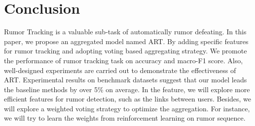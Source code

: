 \section{Conclusion}
\label{sec:conclusion}
Rumor Tracking is a valuable sub-task of automatically rumor defeating. In this paper, we propose an aggregated model named ART.  By adding specific features for rumor tracking and adopting voting based aggregating strategy. We promote the performance of rumor tracking task on accuracy and macro-F1 score. Also, well-designed experiments are carried out to demonstrate the effectiveness of ART. Experimental results on benchmark datasets suggest that our model leads the baseline methods by over 5\% on average. In the feature, we will explore more efficient features for rumor detection, such as the links between users. Besides, we will explore a weighted voting strategy to optimize the aggregation. For instance, we will try to learn the weights from reinforcement learning on rumor sequence.